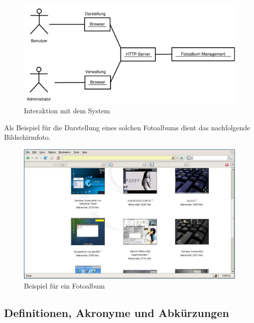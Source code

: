 \documentclass[a4paper,12pt,liststotocnumbered]{scrartcl}
\begin{document}
\begin{figure}[bh]
	\begin{center}
		\includegraphics[width=\textwidth*3/4]{ueberblick}
		\caption{Interaktion mit dem System}
		\label{overview}
	\end{center}
\end{figure}

\newpage

Als Beispiel für die Darstellung eines solchen Fotoalbums dient das
nachfolgende Bildschirmfoto.

\begin{figure}[bh]
	\begin{center}
		\includegraphics[width=\textwidth]{gallery}
		\caption{Beispiel für ein Fotoalbum}
		\label{sample}
	\end{center}
\end{figure}

\subsection{Definitionen, Akronyme und Abkürzungen}
\end{document}
